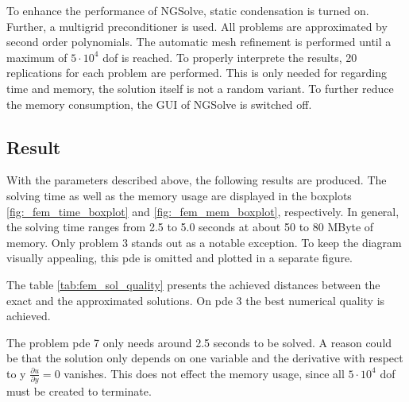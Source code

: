 \documentclass[./\jobname.tex]{subfiles}
\begin{document}
To enhance the performance of NGSolve, static condensation is turned on. Further, a multigrid preconditioner is used. All problems are approximated by second order polynomials. The automatic mesh refinement is performed until a maximum of $5 \cdot 10^4$ \gls{dof} is reached. To properly interprete the results, 20 replications for each problem are performed. This is only needed for regarding time and memory, the solution itself is not a random variant. To further reduce the memory consumption, the GUI of NGSolve is switched off. 

\subsection{Result}
With the parameters described above, the following results are produced. The solving time as well as the memory usage are displayed in the boxplots \ref{fig:_fem_time_boxplot} and \ref{fig:_fem_mem_boxplot}, respectively. In general, the solving time ranges from 2.5 to 5.0 seconds at about 50 to 80 MByte of memory. Only problem 3 stands out as a notable exception. To keep the diagram visually appealing, this \gls{pde} is omitted and plotted in a separate figure. 

The table \ref{tab:fem_sol_quality} presents the achieved distances between the exact and the approximated solutions. On \gls{pde} 3 the best numerical quality is achieved.

The problem \gls{pde} 7 only needs around 2.5 seconds to be solved. A reason could be that the solution only depends on one variable and the derivative with respect to y $\frac{\partial u}{\partial y} = 0$ vanishes. This does not effect the memory usage, since all $5 \cdot 10^4$ \gls{dof} must be created to terminate. 
\end{document}
